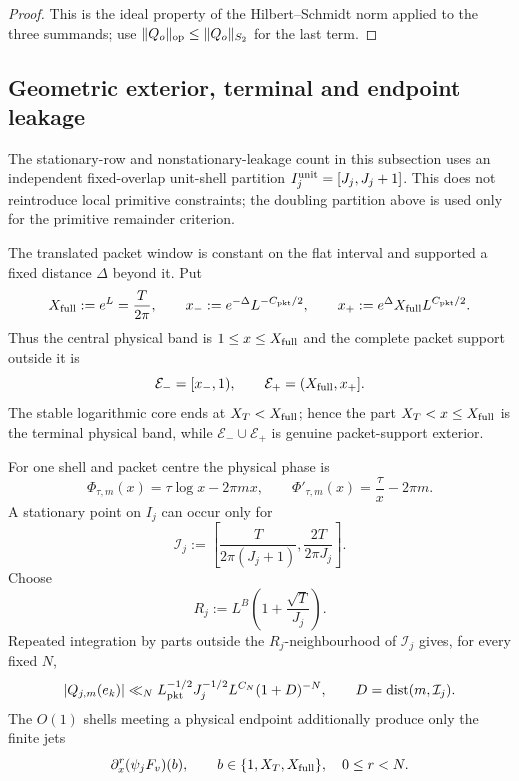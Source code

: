 \begin{proof}
This is the ideal property of the Hilbert--Schmidt norm applied to the three
summands; use $\|Q_o\|_{\operatorname{op}}\le\|Q_o\|_{S_2}$ for the last term.
\end{proof}

\subsection{Geometric exterior, terminal and endpoint leakage}

The stationary-row and nonstationary-leakage count in this subsection uses an
independent fixed-overlap unit-shell partition
$I_j^{\rm unit}=[J_j,J_j+1]$.  This does not reintroduce local primitive
constraints; the doubling partition above is used only for the primitive
remainder criterion.

The translated packet window is constant on the flat interval and supported a
fixed distance $\Delta$ beyond it.  Put
\begin{equation}
X_{\rm full}:=e^L=\frac{T}{2\pi},
\qquad
x_-:=e^{-\Delta}L^{-C_{\rm pkt}/2},
\qquad
x_+:=e^{\Delta}X_{\rm full}L^{C_{\rm pkt}/2}.
\label{eq:geometric-exterior-range}
\end{equation}
Thus the central physical band is $1\le x\le X_{\rm full}$ and the complete
packet support outside it is
\[
\mathcal E_-=[x_-,1),
\qquad
\mathcal E_+=(X_{\rm full},x_+].
\]
The stable logarithmic core ends at $X_T<X_{\rm full}$; hence the part
$X_T<x\le X_{\rm full}$ is the terminal physical band, while
$\mathcal E_-\cup\mathcal E_+$ is genuine packet-support exterior.

For one shell and packet centre the physical phase is
\[
\Phi_{\tau,m}(x)=\tau\log x-2\pi mx,
\qquad
\Phi'_{\tau,m}(x)=\frac\tau x-2\pi m.
\]
A stationary point on $I_j$ can occur only for
\begin{equation}
\mathcal I_j
:=\left[\frac{T}{2\pi(J_j+1)},\frac{2T}{2\pi J_j}\right].
\label{eq:stationary-interval}
\end{equation}
Choose
\begin{equation}
R_j:=L^B\left(1+\frac{\sqrt T}{J_j}\right).
\label{eq:shell-margin}
\end{equation}
Repeated integration by parts outside the $R_j$-neighbourhood of
$\mathcal I_j$ gives, for every fixed $N$,
\begin{equation}
|Q_{j,m}(e_k)|
\ll_NL_{\rm pkt}^{-1/2}J_j^{-1/2}L^{C_N}(1+D)^{-N},
\qquad D=\operatorname{dist}(m,\mathcal I_j).
\label{eq:nonstat-shell}
\end{equation}
The $O(1)$ shells meeting a physical endpoint additionally produce only the
finite jets
\begin{equation}
\partial_x^r(\psi_jF_v)(b),
\qquad b\in\{1,X_T,X_{\rm full}\},\quad0\le r<N.
\label{eq:boundary-shell-jets}
\end{equation}

